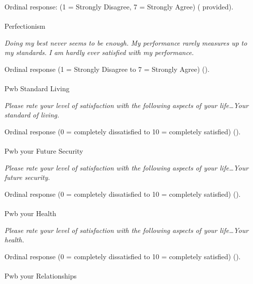\documentclass[
  single column]{article}
\makeatletter
\let\oldparagraph\paragraph
\renewcommand{\paragraph}{
    \@ifstar
      \xxxParagraphStar
      \xxxParagraphNoStar
  }
\newcommand{\xxxParagraphStar}[1]{\oldparagraph*{#1}\mbox{}}
\newcommand{\xxxParagraphNoStar}[1]{\oldparagraph{#1}\mbox{}}
\makeatother
\begin{document}
Ordinal response: (1 = Strongly Disagree, 7 = Strongly Agree)
( provided).

\paragraph{Perfectionism}\label{perfectionism}

\emph{Doing my best never seems to be enough.} \emph{My performance
rarely measures up to my standards.} \emph{I am hardly ever satisfied
with my performance.}

Ordinal response (1 = Strongly Disagree to 7 = Strongly Agree)
().

\paragraph{Pwb Standard Living}\label{pwb-standard-living}

\emph{Please rate your level of satisfaction with the following aspects
of your life\ldots Your standard of living.}

Ordinal response (0 = completely dissatisfied to 10 = completely
satisfied) ().

\paragraph{Pwb your Future Security}\label{pwb-your-future-security}

\emph{Please rate your level of satisfaction with the following aspects
of your life\ldots Your future security.}

Ordinal response (0 = completely dissatisfied to 10 = completely
satisfied) ().

\paragraph{Pwb your Health}\label{pwb-your-health}

\emph{Please rate your level of satisfaction with the following aspects
of your life\ldots Your health.}

Ordinal response (0 = completely dissatisfied to 10 = completely
satisfied) ().

\paragraph{Pwb your Relationships}\label{pwb-your-relationships}
\end{document}
